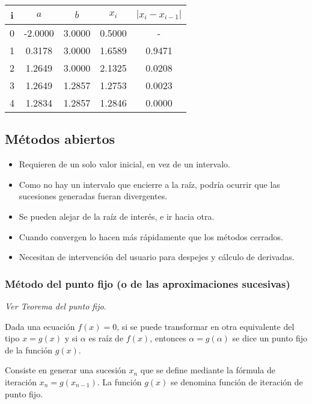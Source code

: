 \documentclass{article}
\begin{document}
\begin{table}[h]
\centering
\begin{tabular}{ccccc}
    i & $a$     & $b$    & $x_i$  & $|x_i - x_{i-1}|$ \\\hline
    0 & -2.0000 & 3.0000 & 0.5000 & -                 \\
    1 & 0.3178  & 3.0000 & 1.6589 & 0.9471            \\
    2 & 1.2649  & 3.0000 & 2.1325 & 0.0208            \\
    3 & 1.2649  & 1.2857 & 1.2753 & 0.0023            \\
    4 & 1.2834  & 1.2857 & 1.2846 & 0.0000            \\
\end{tabular}
\end{table}

\subsection{Métodos abiertos}

\begin{itemize}
    \item Requieren de un solo valor inicial, en vez de un intervalo.
    \item Como no hay un intervalo que encierre a la raíz, podría ocurrir que
        las sucesiones generadas fueran divergentes.
    \item Se pueden alejar de la raíz de interés, e ir hacia otra.
    \item Cuando convergen lo hacen más rápidamente que los métodos cerrados.
    \item Necesitan de intervención del usuario para despejes y cálculo de
        derivadas.
\end{itemize}

\subsubsection{Método del punto fijo (o de las aproximaciones sucesivas)}

\textit{Ver Teorema del punto fijo}.

Dada una ecuación $f(x)=0$, si se puede transformar en otra equivalente del tipo
$x = g(x)$ y si $\alpha$ es raíz de $f(x)$, entonces $\alpha = g(\alpha)$ se 
dice un punto fijo de la función $g(x)$.

Consiste en generar una sucesión ${x_n}$ que se define mediante la fórmula de 
iteración $x_n = g(x_{n-1})$. La función $g(x)$ se denomina función de iteración
de punto fijo.
\end{document}
